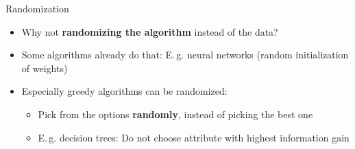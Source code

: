 \begin{frame}{Randomization}{}
	\begin{itemize}
		\item Why not \textbf{randomizing the algorithm} instead of the data?
		\item Some algorithms already do that: E.\,g. neural networks (random initialization of weights)
		\item Especially greedy algorithms can be randomized:
		\begin{itemize}
			\item Pick from the options \textbf{randomly}, instead of picking the best one
			\item E.\,g. decision trees: Do not choose attribute with highest information gain
		\end{itemize}
	\end{itemize}
	
	\vspace*{2mm}
	\begin{boxBlueNoFrame}
	\end{boxBlueNoFrame}
\end{frame}


